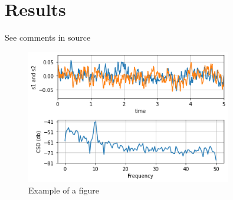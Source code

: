\section{Results}

See comments in source

\begin{figure}[h]
\centering
\includegraphics[width=0.8\textwidth]{figures/fig1.png}
\caption{Example of a figure}
\end{figure}






